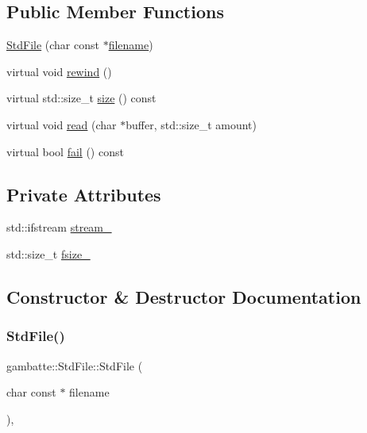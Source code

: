 \subsection*{Public Member Functions}
\begin{DoxyCompactItemize}
\item 
\hyperlink{classgambatte_1_1StdFile_a9a170e2cfd76c7899f42e1e5cd4854f5}{Std\+File} (char const $\ast$\hyperlink{ioapi_8h_a7a03a664b090ce5c848ecb31cb4a2fa8}{filename})
\item 
virtual void \hyperlink{classgambatte_1_1StdFile_aa9f4ffbac979a4bf7607992eff78f469}{rewind} ()
\item 
virtual std\+::size\+\_\+t \hyperlink{classgambatte_1_1StdFile_aac486706e2f657b7396757ee9f8e7352}{size} () const
\item 
virtual void \hyperlink{classgambatte_1_1StdFile_a8c9c0994af30457e852ee887c1f9b38c}{read} (char $\ast$buffer, std\+::size\+\_\+t amount)
\item 
virtual bool \hyperlink{classgambatte_1_1StdFile_aa4f8f0f2854e3b11a71cb3d3109908eb}{fail} () const
\end{DoxyCompactItemize}
\subsection*{Private Attributes}
\begin{DoxyCompactItemize}
\item 
std\+::ifstream \hyperlink{classgambatte_1_1StdFile_a8a29b037eee32db589450ae81acdb5b9}{stream\+\_\+}
\item 
std\+::size\+\_\+t \hyperlink{classgambatte_1_1StdFile_a67ba9f58b97f9265a1db204638005a4d}{fsize\+\_\+}
\end{DoxyCompactItemize}


\subsection{Constructor \& Destructor Documentation}
\mbox{\label{classgambatte_1_1StdFile_a9a170e2cfd76c7899f42e1e5cd4854f5}} 
\subsubsection{\texorpdfstring{Std\+File()}{StdFile()}}
{\footnotesize\ttfamily gambatte\+::\+Std\+File\+::\+Std\+File (\begin{DoxyParamCaption}\item[{char const $\ast$}]{filename }\end{DoxyParamCaption})\hspace{0.3cm}{\ttfamily [inline]}, {\ttfamily [explicit]}}



